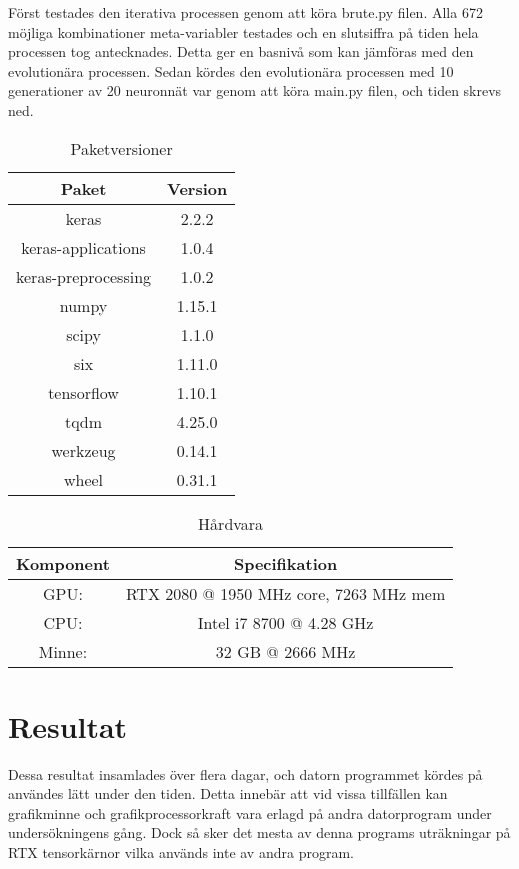 \documentclass[a4paper, 12pt]{article}
\begin{document}
    Först testades den iterativa processen genom att köra brute.py filen. Alla 672 möjliga kombinationer meta-variabler testades och en slutsiffra på tiden hela processen tog antecknades. Detta ger en basnivå som kan jämföras med den evolutionära processen. Sedan kördes den evolutionära processen med 10 generationer av 20 neuronnät var genom att köra main.py filen, och tiden skrevs ned.


\begin{table}[H]
    \centering
    \begin{tabular}{c|c}
      Paket & Version \\
      \hline
      keras & 2.2.2 \\
      keras-applications & 1.0.4 \\
      keras-preprocessing & 1.0.2 \\
      numpy & 1.15.1 \\
      scipy & 1.1.0 \\
      six & 1.11.0 \\
      tensorflow & 1.10.1 \\
      tqdm & 4.25.0 \\
      werkzeug & 0.14.1 \\
      wheel & 0.31.1
    \end{tabular}
    \caption{Paketversioner}
    \label{paketversioner}
\end{table}

\begin{table}[H]
    \centering
    \begin{tabular}{c|c}
      Komponent & Specifikation \\
      \hline
      GPU: & RTX 2080 @ 1950 MHz core, 7263 MHz mem \\
      CPU: & Intel i7 8700 @ 4.28 GHz \\
      Minne: & 32 GB @ 2666 MHz \\
    \end{tabular}
    \caption{Hårdvara}
    \label{hårdvara}
\end{table}

  \section{Resultat}

  Dessa resultat insamlades över flera dagar, och datorn programmet kördes på användes lätt under den tiden. Detta innebär att vid vissa tillfällen kan grafikminne och grafikprocessorkraft vara erlagd på andra datorprogram under undersökningens gång. Dock så sker det mesta av denna programs uträkningar på RTX tensorkärnor vilka används inte av andra program.
\end{document}
